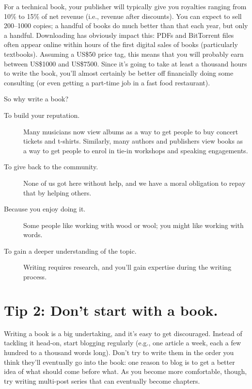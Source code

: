 \documentclass[10pt,letterpaper]{article}
\begin{document}
For a technical book,
your publisher will typically give you royalties ranging from 10\% to 15\% of net revenue
(i.e., revenue after discounts).
You can expect to sell 200–1000 copies;
a handful of books do much better than that each year,
but only a handful.
Downloading has obviously impact this:
PDFs and BitTorrent files often appear online
within hours of the first digital sales of books (particularly textbooks).
Assuming a US\$50 price tag,
this means that you will probably earn between US\$1000 and US\$7500.
Since it's going to take at least a thousand hours to write the book,
you'll almost certainly be better off financially doing some consulting
(or even getting a part-time job in a fast food restaurant).

So why write a book?

\begin{description}

\item[To build your reputation.]
  Many musicians now view albums as a way to get people to buy concert tickets and t-shirts.
  Similarly, many authors and publishers view books as a way to get people
  to enrol in tie-in workshops and speaking engagements.
  
\item[To give back to the community.]
  None of us got here without help,
  and we have a moral obligation to repay that by helping others.
  
\item[Because you enjoy doing it.]
  Some people like working with wood or wool;
  you might like working with words.
  
\item[To gain a deeper understanding of the topic.]
  Writing requires research,
  and you'll gain expertise during the writing process.
  
\end{description}

\section*{Tip 2: Don't start with a book.}

Writing a book is a big undertaking, and it's easy to get discouraged.
Instead of tackling it head-on,
start blogging regularly
(e.g.,
one article a week, each a few hundred to a thousand words long).
Don't try to write them in the order you think they'll eventually go into the book:
one reason to blog is to get a better idea of what should come before what.
As you become more comfortable,
though,
try writing multi-post series that can eventually become chapters.
\end{document}
